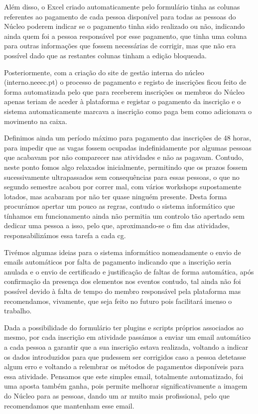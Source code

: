 Além disso, o Excel criado automaticamente pelo formulário tinha as colunas referentes ao pagamento de cada pessoa disponível para todas as pessoas do Núcleo poderem indicar se o pagamento tinha sido realizado ou não, indicando ainda quem foi a pessoa responsável por esse pagamento, que tinha uma coluna para outras informações que fossem necessárias de corrigir, mas que não era possível dado que as restantes colunas tinham a edição bloqueada.

Posteriormente, com a criação do site de gestão interna do núcleo (interno.neeec.pt) o processo de pagamento e registo de inscrições ficou feito de forma automatizada pelo que para receberem inscrições os membros do Núcleo apenas teriam de aceder à plataforma e registar o pagamento da inscrição e o sistema automaticamente marcava a inscrição como paga bem como adicionava o movimento na caixa.

Definimos ainda um período máximo para pagamento das inscrições de 48 horas, para impedir que as vagas fossem ocupadas indefinidamente por algumas pessoas que acabavam por não comparecer nas atividades e não as pagavam. Contudo, neste ponto fomos algo relaxados inicialmente, permitindo que os prazos fossem sucessivamente ultrapassados sem consequências para essas pessoas, o que no segundo semestre acabou por correr mal, com vários workshops supostamente lotados, mas acabaram por não ter quase ninguém presente. Desta forma procurámos apertar um pouco as regras, contudo o sistema informático que tínhamos em funcionamento ainda não permitia um controlo tão apertado sem dedicar uma pessoa a isso, pelo que, aproximando-se o fim das atividades, responsabilizámos essa tarefa a cada \acrshort{cg}.

Tivémos algumas ideias para o sistema informático nomeadamente o envio de emails automáticos por falta de pagamento indicando que a inscrição seria anulada e o envio de certificado e justificação de faltas de forma automática, após confirmação da presença dos elementos nos eventos contudo, tal ainda não foi possível devido à falta de tempo do membro responsável pela plataforma mas recomendamos, vivamente, que seja feito no futuro pois facilitará imenso o trabalho.

Dada a possibilidade do formulário ter plugins e scripts próprios associados ao mesmo, por cada inscrição em atividade passámos a enviar um email automático a cada pessoa a garantir que a sua inscrição estava realizada, voltando a indicar os dados introduzidos para que pudessem ser corrigidos caso a pessoa detetasse algum erro e voltando a relembrar os métodos de pagamentos disponíveis para essa atividade. Pensamos que este simples email, totalmente automatizado, foi uma aposta também ganha, pois permite melhorar significativamente a imagem do Núcleo para as pessoas, dando um ar muito mais profissional, pelo que recomendamos que mantenham esse email.

